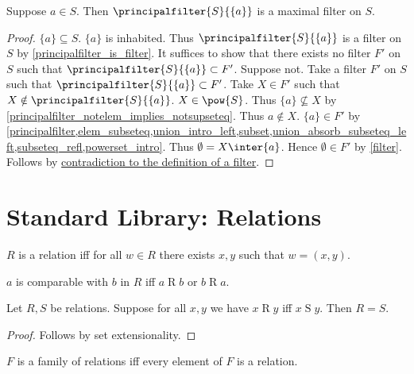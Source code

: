 \begin{proposition}\label{principalfilter_singleton_is_maximal_filter}
    Suppose $a\in S$.
    Then $\principalfilter{S}{\{a\}}$ is a maximal filter on $S$.
\end{proposition}
\begin{proof}
    $\{a\}\subseteq S$.
    $\{a\}$ is inhabited.
    Thus $\principalfilter{S}{\{a\}}$ is a filter on $S$ by \cref{principalfilter_is_filter}.
    It suffices to show that there exists no filter $F'$ on $S$ such that $\principalfilter{S}{\{a\}}\subset F'$.
    Suppose not.
    Take a filter $F'$ on $S$ such that $\principalfilter{S}{\{a\}}\subset F'$.
    Take $X\in F'$ such that $X\notin \principalfilter{S}{\{a\}}$.
    $X\in\pow{S}$.
    Thus $\{a\}\not\subseteq X$ by \cref{principalfilter_notelem_implies_notsupseteq}.
    Thus $a\notin X$.
    $\{a\}\in F'$
        by \cref{principalfilter,elem_subseteq,union_intro_left,subset,union_absorb_subseteq_left,subseteq_refl,powerset_intro}.
    Thus $\emptyset = X\inter \{a\}$.
    Hence $\emptyset\in F'$ by \cref{filter}.
    Follows by \hyperref[filter]{contradiction to the definition of a filter}.
\end{proof}

\section{Standard Library: Relations}

\begin{definition}\label{relation}
    $R$ is a relation iff
    for all $w\in R$ there exists $x, y$ such that $w = (x, y)$.
\end{definition}

\begin{definition}\label{comparable}
    $a$ is comparable with $b$ in $R$ iff $a\mathrel{R}b$ or $b\mathrel{R}a$.
\end{definition}

\begin{proposition}\label{relext}
    Let $R, S$ be relations.
    Suppose for all $x,y$ we have $x\mathrel{R} y$ iff $x\mathrel{S} y$.
    Then $R = S$.
\end{proposition}
\begin{proof}
    Follows by set extensionality.
\end{proof}

\begin{abbreviation}\label{family_of_relations}
    $F$ is a family of relations iff
    every element of $F$ is a relation.
\end{abbreviation}

